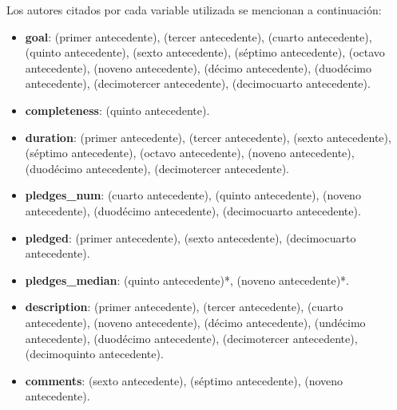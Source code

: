 Los autores citados por cada variable utilizada se mencionan a continuación:
\begin{itemize}
	\item \textbf{goal}: \citeauthor{pr_kamath2018suplearn} (primer antecedente), \citeauthor{pr_zhou2015projectdesc} (tercer antecedente), \citeauthor{pr_yuan2016textanalytics} (cuarto antecedente), \citeauthor{pr_chen2015predcrowd} (quinto antecedente), \citeauthor{pr_li2016predcrowd} (sexto antecedente), \citeauthor{pr_kaur2017socmedcrowd} (séptimo antecedente), \citeauthor{pr_yu2018deeplearning} (octavo antecedente), \citeauthor{pr_jin2019dayssuccess} (noveno antecedente), \citeauthor{pr_cheng2019deeplearning} (décimo antecedente), \citeauthor{pr_mitra2014phrases} (duodécimo antecedente), \citeauthor{pr_sawhney2016usingLT} (decimotercer antecedente), \citeauthor{pr_chen2013kickpredict} (decimocuarto antecedente).
	\item \textbf{completeness}: \citeauthor{pr_chen2015predcrowd} (quinto antecedente).
	\item \textbf{duration}: \citeauthor{pr_kamath2018suplearn} (primer antecedente), \citeauthor{pr_zhou2015projectdesc} (tercer antecedente), \citeauthor{pr_li2016predcrowd} (sexto antecedente), \citeauthor{pr_kaur2017socmedcrowd} (séptimo antecedente), \citeauthor{pr_yu2018deeplearning} (octavo antecedente), \citeauthor{pr_jin2019dayssuccess} (noveno antecedente), \citeauthor{pr_mitra2014phrases} (duodécimo antecedente), \citeauthor{pr_sawhney2016usingLT} (decimotercer antecedente).
	\item \textbf{pledges\_num}: \citeauthor{pr_yuan2016textanalytics} (cuarto antecedente), \citeauthor{pr_chen2015predcrowd} (quinto antecedente), \citeauthor{pr_jin2019dayssuccess} (noveno antecedente), \citeauthor{pr_mitra2014phrases} (duodécimo antecedente), \citeauthor{pr_chen2013kickpredict} (decimocuarto antecedente).
	\item \textbf{pledged}: \citeauthor{pr_kamath2018suplearn} (primer antecedente), \citeauthor{pr_li2016predcrowd} (sexto antecedente), \citeauthor{pr_chen2013kickpredict} (decimocuarto antecedente).
	\item \textbf{pledges\_median}: \citeauthor{pr_chen2015predcrowd} (quinto antecedente)*, \citeauthor{pr_jin2019dayssuccess} (noveno antecedente)*.
	\item \textbf{description}: \citeauthor{pr_kamath2018suplearn} (primer antecedente), \citeauthor{pr_zhou2015projectdesc} (tercer antecedente), \citeauthor{pr_yuan2016textanalytics} (cuarto antecedente), \citeauthor{pr_jin2019dayssuccess} (noveno antecedente), \citeauthor{pr_cheng2019deeplearning} (décimo antecedente), \citeauthor{pr_chen2019keywords_crowdfunding} (undécimo antecedente), \citeauthor{pr_mitra2014phrases} (duodécimo antecedente), \citeauthor{pr_sawhney2016usingLT} (decimotercer antecedente), \citeauthor{pr_chaichi2019nlp_3dprinting} (decimoquinto antecedente).
	\item \textbf{comments}: \citeauthor{pr_li2016predcrowd} (sexto antecedente), \citeauthor{pr_kaur2017socmedcrowd} (séptimo antecedente), \citeauthor{pr_jin2019dayssuccess} (noveno antecedente).
\end{itemize}

